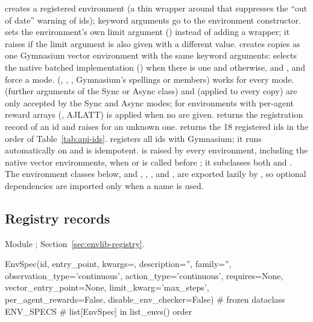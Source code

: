  creates a registered environment (a thin wrapper around
 that suppresses the ``out of date'' warning of
 ids); keyword arguments go to the environment constructor.
 sets the environment's own limit argument
() instead of adding a  wrapper; it
raises  if the limit argument is also given with a different
value.  creates  copies as one Gymnasium vector
environment with the same keyword arguments: 
selects the native batched implementation ()
when there is one and  otherwise, and
,  and  force a mode.
 (, ,
, Gymnasium's spellings or  members) works
for every mode.  (further arguments of the Sync or Async
class) and  (applied to every copy) are only accepted by the
Sync and Async modes; for environments with per-agent reward arrays
(, AJLATT)  is applied when
no  are given.
 returns the registration record of an id and raises
 for an unknown one.  returns the 18 registered
ids in the order of Table~\ref{tab:api-ids}.  registers all
ids with Gymnasium; it runs automatically on  and is
idempotent.  is raised by every environment, including
the native vector environments, when  or  is
called before ; it subclasses both  and
. The environment classes below, and
, , ,  and
, are exported lazily by , so optional
dependencies are imported only when a name is used.

\subsection{Registry records}

Module ; Section~\ref{sec:envlib-registry}.

\begin{pycode}
EnvSpec(id, entry_point, kwargs={}, description='', family='',
        observation_type='continuous', action_type='continuous',
        requires=None, vector_entry_point=None, limit_kwarg='max_steps',
        per_agent_rewards=False, disable_env_checker=False)   # frozen dataclass
ENV_SPECS                               # list[EnvSpec] in list_envs() order
\end{pycode}


